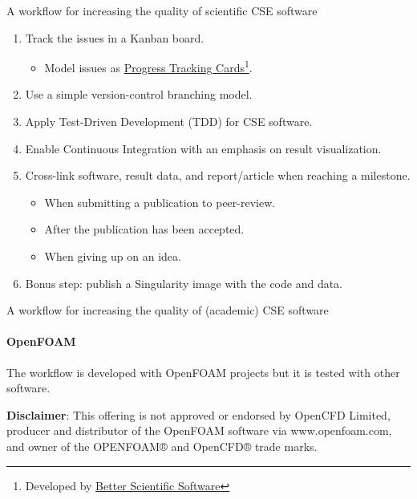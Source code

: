 \documentclass[
	aspectratio=169,%
	color={accentcolor=2d},
	logo=true,%
	colorframetitle=true,%
	]{tudabeamer}
\begin{document}
\begin{frame}{A workflow for increasing the quality of scientific CSE software} 

    \vfill
    \begin{enumerate}
        \item Track the issues in a Kanban board. 
            \begin{itemize}
                \item Model issues as \href{https://betterscientificsoftware.github.io/PSIP-Tools/PTCs/}{Progress Tracking Cards}\footnote{Developed by \href{https://bssw.io/}{Better Scientific Software}}.
            \end{itemize}
        \item Use a simple version-control branching model. 
        \item Apply Test-Driven Development (TDD) for CSE software.
        \item Enable Continuous Integration with an emphasis on result visualization. 
        \item Cross-link software, result data, and report/article when reaching a milestone.
            \begin{itemize}
                \item When submitting a publication to peer-review. 
                \item After the publication has been accepted. 
                \item When giving up on an idea. 
            \end{itemize}
        \item Bonus step: publish a Singularity image with the code and data.
    \end{enumerate}
\end{frame}

\begin{frame}{A workflow for increasing the quality of (academic) CSE software} 
    \framesubtitle{OpenFOAM}

        \vfill

        The workflow is developed with OpenFOAM projects but it is tested with other software. 

        \vspace{1cm}

        \textbf{Disclaimer}: This offering is not approved or endorsed by OpenCFD Limited, producer and distributor of the OpenFOAM software via www.openfoam.com, and owner of the OPENFOAM®  and OpenCFD®  trade marks. 

\end{frame}
\end{document}
